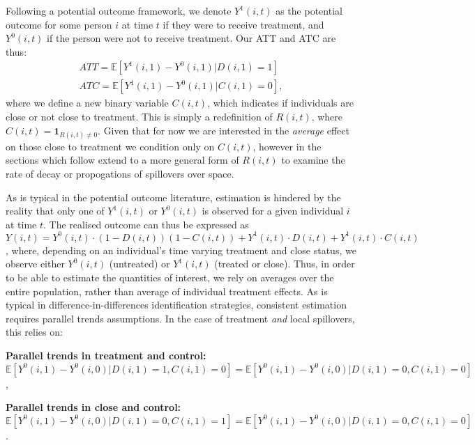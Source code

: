 Following a potential outcome framework, we denote $Y^1(i,t)$ as the potential
outcome for some person $i$ at time $t$ if they were to receive treatment, and
$Y^0(i,t)$ if the person were not to receive treatment.  Our ATT and ATC are
thus:
\begin{eqnarray}
\label{Seqn:estimATT}
ATT=\mathbb{E}[Y^1(i,1)-Y^0(i,1)|D(i,1)=1]\  \\
\label{Seqn:estimATC}
ATC=\mathbb{E}[Y^1(i,1)-Y^0(i,1)|C(i,1)= 0],
\end{eqnarray}
where we define a new binary variable $C(i,t)$, which indicates if individuals 
are close or not close to treatment.  This is simply a redefinition of $R(i,t)$,
where $C(i,t)=\mathbf{1}_{R(i,t)\neq 0}$.  Given that for now we are interested
in the \emph{average} effect on those close to treatment we condition only on
$C(i,t)$, however in the sections which follow extend to a more general form of
$R(i,t)$ to examine the rate of decay or propogations of spillovers over space.

As is typical in the potential outcome literature, estimation is hindered by the
reality that only one of $Y^1(i,t)$ or $Y^0(i,t)$ is observed for a given 
individual $i$ at time $t$.  The realised outcome can thus be expressed as 
$Y(i,t)=Y^0(i,t)\cdot (1-D(i,t))(1-C(i,t))+Y^1(i,t)\cdot D(i,t)+Y^1(i,t)\cdot 
C(i,t)$, where, depending on an individual's time varying treatment and close
status, we observe either $Y^0(i,t)$ (untreated) or $Y^1(i,t)$ (treated or 
close).  Thus, in order to be able to estimate the quantities of interest, we 
rely on averages over the entire population, rather than average of individual 
treatment effects.  As is typical in difference-in-differences identification
strategies, consistent estimation requires parallel trends assumptions.  In the 
case of treatment \emph{and} local spillovers, this relies on:

\begin{assumption}{1}{}
\label{Sass:PT}
\textbf{Parallel trends in treatment and control:} \\
$\mathbb{E}[Y^0(i,1)-Y^0(i,0)|D(i,1)=1,C(i,1)=0]=
\mathbb{E}[Y^0(i,1)-Y^0(i,0)|D(i,1)=0,C(i,1)=0]$,
\end{assumption}
\begin{assumption}{2}{}
\label{Sass:PTC}
\textbf{Parallel trends in close and control:} \\
$\mathbb{E}[Y^0(i,1)-Y^0(i,0)|D(i,1)=0,C(i,1)=1]=
\mathbb{E}[Y^0(i,1)-Y^0(i,0)|D(i,1)=0,C(i,1)=0]$.
\end{assumption}


